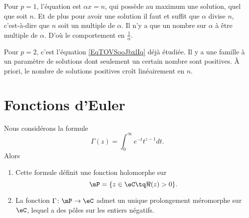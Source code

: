 \begin{example}
    Pour \( p=1\), l'équation est \( \alpha x=n\), qui possède au maximum une solution, quel que soit \( n\). Et de plus pour avoir une solution il faut et suffit que \( \alpha\) divise \( n\), c'est-à-dire que \( n\) soit un multiple de \( \alpha\). Il n'y a que un nombre sur \( \alpha\) à être multiple de \( \alpha\). D'où le comportement en \( \frac{1}{ \alpha }\).

    Pour \( p=2\), c'est l'équation \eqref{EqTOVSooJbxlIq} déjà étudiée. Il y a une famille à un paramètre de solutions dont seulement un certain nombre sont positives. À priori, le nombre de solutions positives croît linéairement en \( n\).
\end{example}

\section{Fonctions d'Euler}

\begin{theorem}   \label{ThoZJYooWKfbVz}
    Nous considérons la formule
    \begin{equation}
        \Gamma(z)=\int_0^{\infty} e^{-t}t^{z-1}dt.
    \end{equation}
    Alors
    \begin{enumerate}
        \item
            Cette formule définit une fonction holomorphe sur
            \begin{equation}
                \mP=\{ z\in \eC\tq \Re(z)>0 \}.
            \end{equation}
        \item
            La fonction \( \Gamma\colon \mP\to \eC\) admet un unique prolongement méromorphe sur \( \eC\), lequel a des pôles sur les entiers négatifs.
    \end{enumerate}
\end{theorem}

